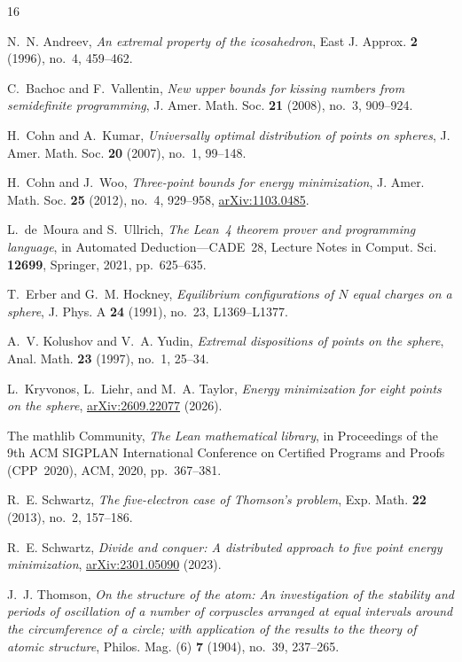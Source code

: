 \documentclass[11pt,reqno]{amsart}
\renewcommand{\_}{\origunderscore\allowbreak}
\theoremstyle{definition}
\begin{document}
\begin{thebibliography}{16}

N.~N. Andreev,
\emph{An extremal property of the icosahedron},
East J. Approx. \textbf{2} (1996), no.~4, 459--462.

C.~Bachoc and F.~Vallentin,
\emph{New upper bounds for kissing numbers from semidefinite programming},
J. Amer. Math. Soc. \textbf{21} (2008), no.~3, 909--924.

H.~Cohn and A.~Kumar,
\emph{Universally optimal distribution of points on spheres},
J. Amer. Math. Soc. \textbf{20} (2007), no.~1, 99--148.

H.~Cohn and J.~Woo,
\emph{Three-point bounds for energy minimization},
J. Amer. Math. Soc. \textbf{25} (2012), no.~4, 929--958,
\href{https://arxiv.org/abs/1103.0485}{arXiv:1103.0485}.

L.~de~Moura and S.~Ullrich,
\emph{The Lean~4 theorem prover and programming language},
in Automated Deduction---CADE~28, Lecture Notes in Comput. Sci. \textbf{12699},
Springer, 2021, pp.~625--635.

T.~Erber and G.~M. Hockney,
\emph{Equilibrium configurations of $N$ equal charges on a sphere},
J. Phys. A \textbf{24} (1991), no.~23, L1369--L1377.

A.~V. Kolushov and V.~A. Yudin,
\emph{Extremal dispositions of points on the sphere},
Anal. Math. \textbf{23} (1997), no.~1, 25--34.

L.~Kryvonos, L.~Liehr, and M.~A. Taylor,
\emph{Energy minimization for eight points on the sphere},
\href{https://arxiv.org/abs/2609.22077}{arXiv:2609.22077} (2026).

The mathlib Community,
\emph{The Lean mathematical library},
in Proceedings of the 9th ACM SIGPLAN International Conference on Certified Programs and Proofs (CPP~2020),
ACM, 2020, pp.~367--381.

R.~E. Schwartz,
\emph{The five-electron case of Thomson's problem},
Exp. Math. \textbf{22} (2013), no.~2, 157--186.

R.~E. Schwartz,
\emph{Divide and conquer: A distributed approach to five point energy minimization},
\href{https://arxiv.org/abs/2301.05090}{arXiv:2301.05090} (2023).

J.~J. Thomson,
\emph{On the structure of the atom: An investigation of the stability and periods of oscillation of a number of corpuscles arranged at equal intervals around the circumference of a circle; with application of the results to the theory of atomic structure},
Philos. Mag. (6) \textbf{7} (1904), no.~39, 237--265.


\end{thebibliography}
\end{document}
